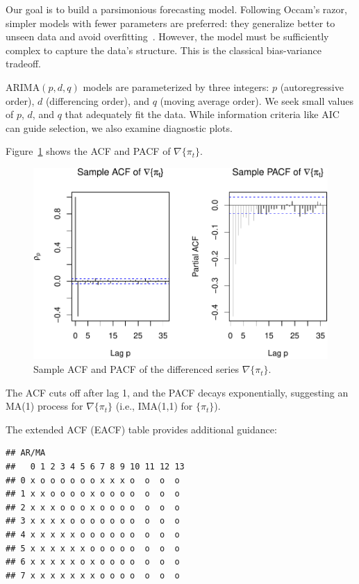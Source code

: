 \documentclass[final,11pt]{article}
\theoremstyle{plain}
\theoremstyle{remark}
\begin{document}
Our goal is to build a parsimonious forecasting model. Following Occam's
razor, simpler models with fewer parameters are preferred: they generalize
better to unseen data and avoid overfitting~\cite{bias_variance}. However,
the model must be sufficiently complex to capture the data's structure.
This is the classical bias-variance tradeoff.

ARIMA$(p,d,q)$ models are parameterized by three integers: $p$
(autoregressive order), $d$ (differencing order), and $q$ (moving average
order). We seek small values of $p$, $d$, and $q$ that adequately fit the
data. While information criteria like AIC can guide selection, we also
examine diagnostic plots.

Figure~\ref{fig:f3} shows the ACF and PACF of $\nabla\{\pi_t\}$.

\begin{figure}
\includegraphics{paper_files/figure-latex/unnamed-chunk-6-1.pdf}
\caption{Sample ACF and PACF of the differenced series $\nabla \{\pi_t\}$.}
\label{fig:f3}
\end{figure}

The ACF cuts off after lag 1, and the PACF decays exponentially,
suggesting an MA(1) process for $\nabla\{\pi_t\}$ (i.e., IMA(1,1) for
$\{\pi_t\}$).

The extended ACF (EACF) table provides additional guidance:

\begin{verbatim}
## AR/MA
##   0 1 2 3 4 5 6 7 8 9 10 11 12 13
## 0 x o o o o o o x x x o  o  o  o
## 1 x x o o o o x o o o o  o  o  o
## 2 x x x o o o x o o o o  o  o  o
## 3 x x x x o o o o o o o  o  o  o
## 4 x x x x x o o o o o o  o  o  o
## 5 x x x x x x o o o o o  o  o  o
## 6 x x x x x o x o o o o  o  o  o
## 7 x x x x x x x o o o o  o  o  o
\end{verbatim}
\end{document}
